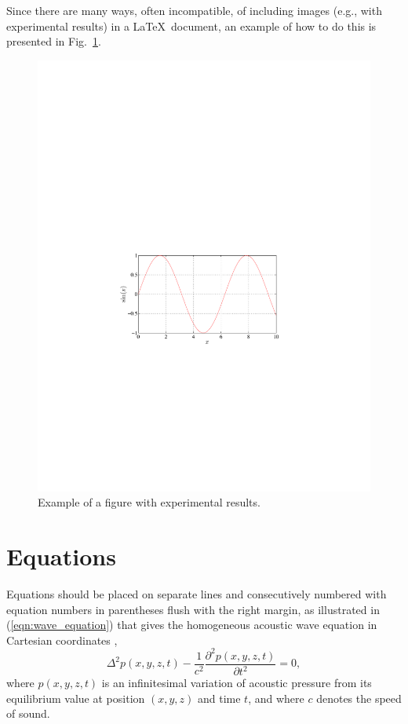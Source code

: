 \documentclass{article}
\begin{document}
\begin{sloppy}
Since there are many ways, often incompatible, of including images (e.g., with experimental results) in a \LaTeX\ document, an example of how to do this is presented in Fig.~\ref{fig:results}. 

\begin{figure}[t]
  \centering
  \centerline{\includegraphics[width=\columnwidth]{fig1a}}
  \caption{Example of a figure with experimental results.}
  \label{fig:results}
\end{figure}

\section{Equations}
\label{sec:equations}

Equations should be placed on separate lines and consecutively numbered with equation numbers in parentheses flush with the right margin, as illustrated in (\ref{eqn:wave_equation}) that gives the homogeneous acoustic wave equation in Cartesian coordinates \cite{eWilliams1999},
\begin{equation}
  \label{eqn:wave_equation}
    \Delta^2p(x,y,z,t)-
    \displaystyle\frac{1}{c^2}\frac{\partial^2p(x,y,z,t)}{\partial t^2}=0,
\end{equation}
where $p(x,y,z,t)$ is an infinitesimal variation of acoustic pressure from its equilibrium value at position $(x,y,z)$ and time $t$, and where $c$ denotes the speed of sound.


\end{sloppy}
\end{document}
